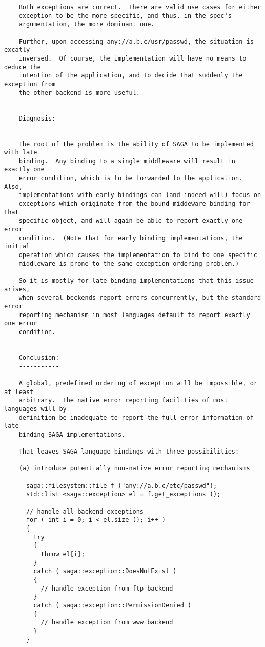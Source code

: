 \documentclass{article}
\begin{document}
\begin{verbatim}
    Both exceptions are correct.  There are valid use cases for either
    exception to be the more specific, and thus, in the spec's
    argumentation, the more dominant one.  

    Further, upon accessing any://a.b.c/usr/passwd, the situation is excatly
    inversed.  Of course, the implementation will have no means to deduce the
    intention of the application, and to decide that suddenly the exception from
    the other backend is more useful.


    Diagnosis:  
    ----------

    The root of the problem is the ability of SAGA to be implemented with late
    binding.  Any binding to a single middleware will result in exactly one
    error condition, which is to be forwarded to the application.  Also,
    implementations with early bindings can (and indeed will) focus on
    exceptions which originate from the bound middeware binding for that
    specific object, and will again be able to report exactly one error
    condition.  (Note that for early binding implementations, the initial
    operation which causes the implementation to bind to one specific
    middleware is prone to the same exception ordering problem.)  
    
    So it is mostly for late binding implementations that this issue arises,
    when several beckends report errors concurrently, but the standard error
    reporting mechanism in most languages default to report exactly one error
    condition.


    Conclusion: 
    -----------

    A global, predefined ordering of exception will be impossible, or at least
    arbitrary.  The native error reporting facilities of most languages will by
    definition be inadequate to report the full error information of late
    binding SAGA implementations.

    That leaves SAGA language bindings with three possibilities:

    (a) introduce potentially non-native error reporting mechanisms

      saga::filesystem::file f ("any://a.b.c/etc/passwd");
      std::list <saga::exception> el = f.get_exceptions ();

      // handle all backend exceptions
      for ( int i = 0; i < el.size (); i++ )
      {
        try
        {
          throw el[i];
        }
        catch ( saga::exception::DoesNotExist )
        {
          // handle exception from ftp backend
        }
        catch ( saga::exception::PermissionDenied )
        {
          // handle exception from www backend
        }
      }



\end{verbatim}
\end{document}
